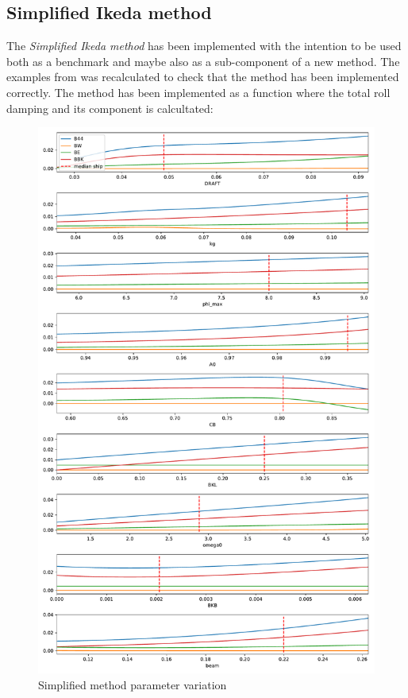 \subsection{Simplified Ikeda method}
\label{se:simplified_ikeda}
The \emph{Simplified Ikeda method} \cite{kawahara_simple_2011} has been implemented with the intention to be used both as a benchmark and maybe also as a sub-component of a new method. The examples from \cite{kawahara_simple_2011} was recalculated to check that the method has been implemented correctly.
The method has been implemented as a function where the total roll damping and its component is calcultated: 


\begin{figure}[H]
    \centering
    \includegraphics[width=0.9\columnwidth]{figures/ikeda_variation.pdf}
    \caption{Simplified method parameter variation}
    \label{fig:ikeda_variation}
\end{figure}

